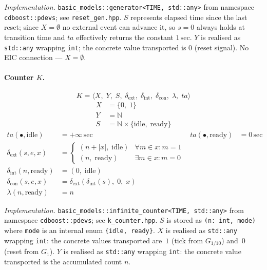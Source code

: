 \noindent\textit{Implementation.}
\texttt{basic\_models::generator<TIME,\,std::any>}
from namespace \texttt{cdboost::pdevs}; see \texttt{reset\_gen.hpp}.
$S$ represents elapsed time since the last reset; since $X = \emptyset$
no external event can advance it, so $s = 0$ always holds at
transition time and $ta$ effectively returns the constant $1\,\text{sec}$.
$Y$ is realised as \texttt{std::any} wrapping \texttt{int};
the concrete value transported is $0$ (reset signal).
No EIC connection --- $X = \emptyset$.

\paragraph{Counter $K$.}

\[
  K = \langle X,\; Y,\; S,\;
       \delta_{\text{ext}},\; \delta_{\text{int}},\; \delta_{\text{con}},\;
       \lambda,\; ta \rangle
\]
\begin{align*}
  X &= \{0,\; 1\} \\
  Y &= \mathbb{N} \\
  S &= \mathbb{N} \times \{\text{idle},\; \text{ready}\}
\end{align*}
\begin{align*}
  ta(\bullet,\text{idle})  &= +\infty\,\text{sec} & ta(\bullet,\text{ready}) &= 0\,\text{sec} \\[4pt]
  \delta_{\text{ext}}(s,e,x) &=
    \begin{cases}
      (n + |x|,\; \text{idle})  & \forall m \in x: m = 1 \\
      (n,\;       \text{ready}) & \exists m \in x: m = 0
    \end{cases} \\[4pt]
  \delta_{\text{int}}(n,\text{ready}) &= (0,\; \text{idle}) \\[4pt]
  \delta_{\text{con}}(s, e, x) &=
    \delta_{\text{ext}}\!\left(\delta_{\text{int}}(s),\; 0,\; x\right) \\[4pt]
  \lambda(n,\text{ready}) &= n
\end{align*}

\noindent\textit{Implementation.}
\texttt{basic\_models::infinite\_counter<TIME,\,std::any>}
from namespace \texttt{cdboost::pdevs}; see \texttt{k\_counter.hpp}.
$S$ is stored as \texttt{(n:~int,~mode)} where \texttt{mode} is an
internal enum \texttt{\{idle,~ready\}}.
$X$ is realised as \texttt{std::any} wrapping \texttt{int}: the concrete
values transported are~$1$ (tick from $G_{1/10}$) and~$0$ (reset from
$G_1$).
$Y$ is realised as \texttt{std::any} wrapping \texttt{int}: the concrete
value transported is the accumulated count $n$.

